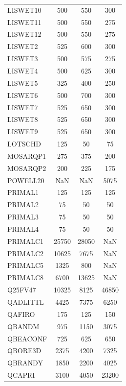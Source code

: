 \begin{longtable}{lccc}
LISWET10 &      500 &      550 &      300 \\
LISWET11 &      500 &      550 &      275 \\
LISWET12 &      500 &      550 &      275 \\
LISWET2  &      525 &      600 &      300 \\
LISWET3  &      500 &      575 &      275 \\
LISWET4  &      500 &      625 &      300 \\
LISWET5  &      325 &      400 &      250 \\
LISWET6  &      500 &      700 &      300 \\
LISWET7  &      525 &      650 &      300 \\
LISWET8  &      525 &      650 &      300 \\
LISWET9  &      525 &      650 &      300 \\
LOTSCHD  &      125 &       50 &       75 \\
MOSARQP1 &      275 &      375 &      200 \\
MOSARQP2 &      200 &      225 &      175 \\
POWELL20 &      NaN &      NaN &     5075 \\
PRIMAL1  &      125 &      125 &      125 \\
PRIMAL2  &       75 &       50 &       50 \\
PRIMAL3  &       75 &       50 &       50 \\
PRIMAL4  &       75 &       50 &       50 \\
PRIMALC1 &    25750 &    28050 &      NaN \\
PRIMALC2 &    10625 &     7675 &      NaN \\
PRIMALC5 &     1325 &      800 &      NaN \\
PRIMALC8 &     6700 &    13625 &      NaN \\
Q25FV47  &    10325 &     8125 &    46850 \\
QADLITTL &     4425 &     7375 &     6250 \\
QAFIRO   &      175 &      125 &      150 \\
QBANDM   &      975 &     1150 &     3075 \\
QBEACONF &      725 &      625 &      650 \\
QBORE3D  &     2375 &     4200 &     7325 \\
QBRANDY  &     1850 &     2200 &     4025 \\
QCAPRI   &     3100 &     4050 &    23200 \\

\end{longtable}
